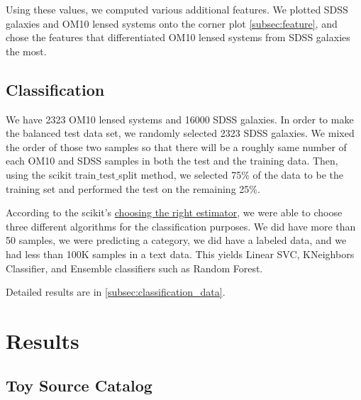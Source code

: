 \documentclass[\docopts]{\docclass}
\begin{document}
Using these values, we computed various additional features. We plotted SDSS galaxies and OM10 lensed systems onto the corner plot \ref{subsec:feature}, and chose the features that differentiated OM10 lensed systems from SDSS galaxies the most.

\subsection{Classification}
\label{subsec:classification}

We have 2323 OM10 lensed systems and 16000 SDSS galaxies. In order to make the balanced test data set, we randomly selected 2323 SDSS galaxies. We mixed the order of those two samples so that there will be a roughly same number of each OM10 and SDSS samples in both the test and the training data. Then, using the scikit train$\_$test$\_$split method, we selected 75$\%$ of the data to be the training set and performed the test on the remaining 25$\%$.

According to the scikit's \href{http://scikit-learn.org/stable/tutorial/machine_learning_map/index.html} {choosing the right estimator}, we were able to choose three different algorithms for the classification purposes. We did have more than 50 samples, we were predicting a category, we did have a labeled data, and we had less than 100K samples in a text data. This yields Linear SVC, KNeighbors Classifier, and Ensemble classifiers such as Random Forest.

Detailed results are in \ref{subsec:classification_data}.


\section{Results}
\label{sec:results}

\subsection{Toy Source Catalog}
\label{subsec:toysource}
\end{document}
